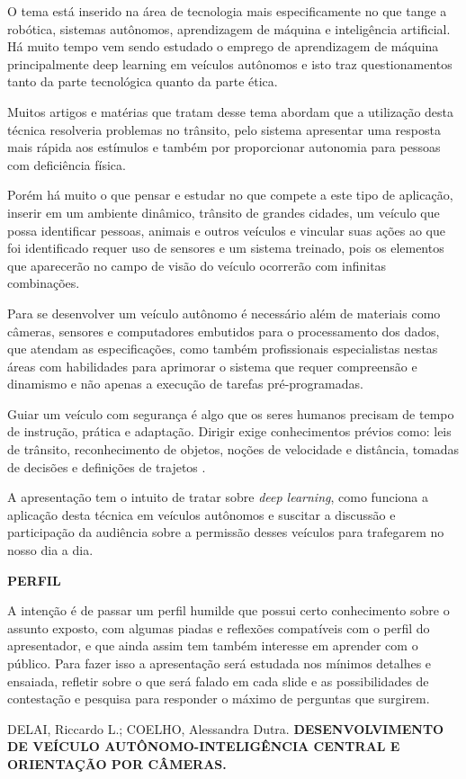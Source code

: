 \documentclass[12pt,a4paper]{article}
\begin{document}
    \par O tema está inserido na área de tecnologia mais especificamente no que tange a robótica, sistemas autônomos, aprendizagem de máquina e inteligência artificial. Há muito tempo vem sendo estudado o emprego de aprendizagem de máquina principalmente deep learning em veículos autônomos e isto traz questionamentos tanto da parte tecnológica quanto da parte ética.
    \par Muitos artigos e matérias que tratam desse tema abordam que a utilização desta técnica resolveria problemas no trânsito, pelo sistema apresentar uma resposta mais rápida aos estímulos e também por proporcionar autonomia para pessoas com deficiência física.
    \par Porém há muito o que pensar e estudar no que compete a este tipo de aplicação, inserir em um ambiente dinâmico, trânsito de grandes cidades, um veículo que possa identificar pessoas, animais e outros veículos e vincular suas ações ao que foi identificado requer uso de sensores e um sistema treinado, pois os elementos que aparecerão no campo de visão do veículo ocorrerão com infinitas combinações.
    \par Para se desenvolver um veículo autônomo é necessário além de materiais como câmeras, sensores e computadores embutidos para o processamento dos dados, que atendam as especificações, como também profissionais especialistas nestas áreas com habilidades para aprimorar o sistema que requer compreensão e dinamismo e não apenas a execução de tarefas pré-programadas.
    \par Guiar um veículo com segurança é algo que os seres humanos precisam de tempo de instrução, prática e adaptação. Dirigir exige conhecimentos prévios como: leis de trânsito, reconhecimento de objetos, noções de velocidade e distância, tomadas de decisões e definições de trajetos \cite{1}.
    \par A apresentação tem o intuito de tratar sobre \emph{deep learning}, como funciona a aplicação desta técnica em veículos autônomos e suscitar a discussão e participação da audiência sobre a permissão desses veículos para trafegarem no nosso dia a dia.

    \textbf{PERFIL}
    \par A intenção é de passar um perfil humilde que possui certo conhecimento sobre o assunto exposto, com algumas piadas e reflexões compatíveis com o perfil do apresentador, e que ainda assim tem também interesse em aprender com o público. Para fazer isso a apresentação será estudada nos mínimos detalhes e ensaiada, refletir sobre o que será falado em cada slide e as possibilidades de contestação e pesquisa para responder o máximo de perguntas que surgirem.


     
    \begin{thebibliography}{BIBLIOGRAFIA}
 
         DELAI, Riccardo L.; COELHO, Alessandra Dutra. \textbf{DESENVOLVIMENTO DE VEÍCULO AUTÔNOMO-INTELIGÊNCIA CENTRAL E ORIENTAÇÃO POR CÂMERAS.}
    
    \end{thebibliography}
\end{document}
